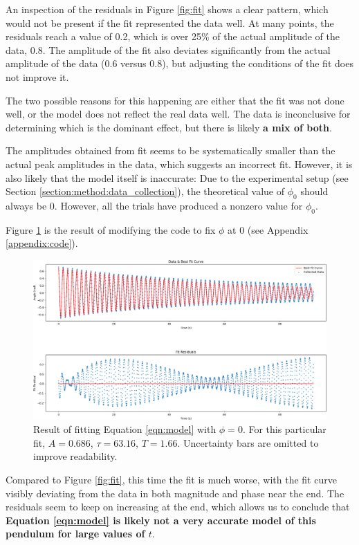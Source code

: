 \documentclass[aps,twocolumn,secnumarabic,nobalancelastpage,amsmath,amssymb,nofootinbib,letterpaper]{revtex4}
\begin{document}
An inspection of the residuals in Figure \ref{fig:fit} shows a clear pattern, which would not be present if the fit
represented the data well. At many points, the residuals reach a value of 0.2, which is over 25\% of the actual
amplitude of the data, 0.8. The amplitude of the fit also deviates significantly from the actual amplitude of the data
(0.6 versus 0.8), but adjusting the conditions of the fit does not improve it.

The two possible reasons for this happening are either that the fit was not done well, or the model does not reflect the
real data well. The data is inconclusive for determining which is the dominant effect, but there is likely \textbf{a mix
of both}.

The amplitudes obtained from fit seems to be systematically smaller than the actual peak amplitudes in the
data, which suggests an incorrect fit. However, it is also likely that the model itself is inaccurate: Due to the
experimental setup (see Section \ref{section:method:data_collection}), the theoretical value of \(\phi_0\) should
always be 0. However, all the trials have produced a nonzero value for \(\phi_0\).

Figure \ref{fig:fit_nophi} is the result of modifying the code to fix \(\phi\) at 0 (see Appendix \ref{appendix:code}).
\begin{figure}[htb]
    \includegraphics[width=0.9\linewidth]{fit3.png}
    \caption{Result of fitting Equation \ref{eqn:model} with \(\phi = 0\). For this particular fit, \(A = 0.686\),
    \(\tau = 63.16\), \(T = 1.66\). Uncertainty bars are omitted to improve readability.}
    \label{fig:fit_nophi}
\end{figure}

Compared to Figure \ref{fig:fit}, this time the fit is much worse, with the fit curve visibly deviating from the data in
both magnitude and phase near the end. The residuals seem to keep on increasing at the end, which allows us to conclude
that \textbf{Equation \ref{eqn:model} is likely not a very accurate model of this pendulum for large values of \(t\)}.
\end{document}
